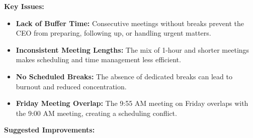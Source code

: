 \documentclass{article}
\begin{document}
\textbf{Key Issues:}

\begin{itemize}
    \item \textbf{Lack of Buffer Time:} Consecutive meetings without breaks prevent the CEO from preparing, following up, or handling urgent matters.
    \item \textbf{Inconsistent Meeting Lengths:} The mix of 1-hour and shorter meetings makes scheduling and time management less efficient.
    \item \textbf{No Scheduled Breaks:} The absence of dedicated breaks can lead to burnout and reduced concentration.
    \item \textbf{Friday Meeting Overlap:} The 9:55 AM meeting on Friday overlaps with the 9:00 AM meeting, creating a scheduling conflict.
\end{itemize}

\textbf{Suggested Improvements:}
\end{document}
